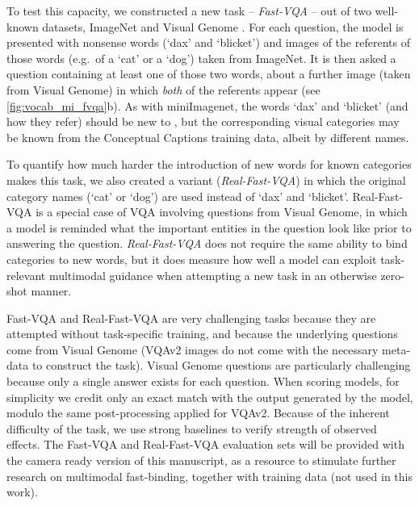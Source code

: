 To test this capacity, we constructed a new task -- \emph{Fast-VQA} -- out of two well-known datasets, ImageNet \cite{russakovsky2015imagenet} and Visual Genome \cite{krishna2017visual}. For each question, the model is presented with nonsense words (`dax' and `blicket') and  images of the referents of those words (e.g.\ of a `cat' or a `dog') taken from ImageNet. It is then asked a question containing at least one of those two words, about a further image (taken from Visual Genome) in which \emph{both} of the referents appear (see \autoref{fig:vocab_mi_fvqa}b). As with miniImagenet, the words `dax' and `blicket' (and how they refer) should be new to \Model, but the corresponding visual categories may be known from the Conceptual Captions training data, albeit by different names.

To quantify how much harder the introduction of new words for known categories makes this task, we also created a variant (\emph{Real-Fast-VQA}) in which the original category names (`cat' or `dog') are used instead of `dax' and `blicket'. Real-Fast-VQA is a special case of VQA involving questions from Visual Genome, in which a model is reminded what the important entities in the question look like prior to answering the question. \emph{Real-Fast-VQA} does not require the same ability to bind categories to new words, but it does measure how well a model can exploit task-relevant multimodal guidance when attempting a new task in an otherwise zero-shot manner.

Fast-VQA and Real-Fast-VQA are very challenging tasks because they are attempted without task-specific training, and because the underlying questions come from Visual Genome (VQAv2 images do not come with the necessary meta-data to construct the task). Visual Genome questions are particularly challenging because only a single answer exists for each question. When scoring models, for simplicity we credit only an exact match with the output generated by the model, modulo the same post-processing applied for VQAv2. Because of the inherent difficulty of the task, we use strong baselines to verify strength of observed effects. The Fast-VQA and Real-Fast-VQA evaluation sets will be provided with the camera ready version of this manuscript, as a resource to stimulate further research on multimodal fast-binding, together with training data (not used in this work).

